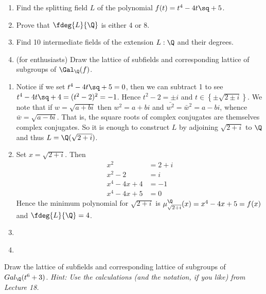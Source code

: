 \documentclass{article}
\begin{document}
\begin{exercise}
  \begin{enumerate}[label=(\alph*)]
    \item Find the splitting field \( L \) of the polynomial \( f(t) = t^4 - 4t\sq + 5 \).
    \item Prove that \( \fdeg{L}{\Q} \) is either 4 or 8.
    \item Find 10 intermediate fields of the extension \( L:\Q \) and their degrees.
    \item (for enthusiasts) Draw the lattice of subfields and corresponding lattice of subgroups of \( \Gal_\Q(f) \).
  \end{enumerate}
\end{exercise}
\begin{enumerate}[label=(\alph*)]
  \item \begin{solution}
    Notice if we set \( t^4 - 4t\sq + 5 = 0 \), then we can subtract 1 to see \( t^4 - 4t\sq + 4 = (t^2 - 2)^2 = -1 \).
    Hence \( t^2 - 2 = \pm i \) and \( t \in \left\{ \pm\sqrt{2\pm i} \right\} \).
    We note that if \( w = \sqrt{a+bi} \) then \( w^2 = a+bi \) and \( \bar{w^2} = \bar{w}^2 = a-bi \), whence \( \bar w = \sqrt{a-bi} \).
    That is, the square roots of complex conjugates are themselves complex conjugates.
    So it is enough to construct \( L \) by adjoining \( \sqrt{2+i} \) to \( \Q \) and thus \( L = \Q(\sqrt{2+i}) \).
  \end{solution}

  \item \begin{solution}
    Set \( x = \sqrt{2+i} \).
    Then \begin{align*}
      x^2 &= 2+i \\
      x^2 - 2 &= i \\
      x^4-4x+4 &= -1 \\
      x^4-4x+5 &= 0
    \end{align*}
    Hence the minimum polynomial for \( \sqrt{2+i} \) is \( \mu_{\sqrt{2+i}}^\Q(x) = x^4-4x+5 = f(x) \) and \( \fdeg{L}{\Q} = 4 \).
  \end{solution}
  \item \begin{solution}

  \end{solution}
  \item \begin{solution}

  \end{solution}
\end{enumerate}

\begin{exercise}
  Draw the lattice of subfields and corresponding lattice of subgroups of \( Gal_\Q(t^6 + 3) \). \it{Hint}: Use the calculations (and the notation, if you like) from Lecture 18.
\end{exercise}
\begin{solution}

\end{solution}
\end{document}
